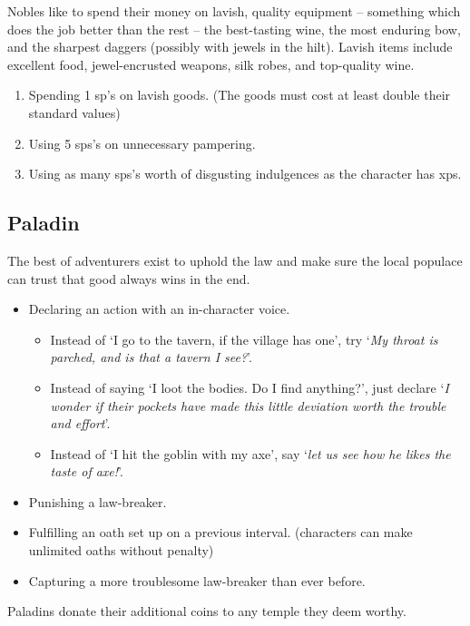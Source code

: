 \begin{multicols}{2}
Nobles like to spend their money on lavish, quality equipment -- something which does the job better than the rest -- the best-tasting wine, the most enduring bow, and the sharpest daggers (possibly with jewels in the hilt).
Lavish items include excellent food, jewel-encrusted weapons, silk robes, and top-quality wine.

\begin{enumerate}
  \item
  Spending 1 \gls{sp}'s on lavish goods.
  (The goods must cost at least double their standard values)
  \item
  Using 5 \glspl{sp}'s on unnecessary pampering.
  \item
  Using as many \glspl{sp}'s worth of disgusting indulgences as the character has \glspl{xp}.
\end{enumerate}

\subsection{Paladin}

The best of adventurers exist to uphold the law and make sure the local populace can trust that good always wins in the end.

\begin{itemize}
  \item
  Declaring an action with an in-character voice.
  \begin{itemize}
    \item
    Instead of `I go to the tavern, if the village has one', try `\textit{My throat is parched, and is that a tavern I see?}'.
    \item
    Instead of saying `I loot the bodies. Do I find anything?', just declare `\textit{I wonder if their pockets have made this little deviation worth the trouble and effort}'.
    \item
    Instead of `I hit the goblin with my axe', say `\textit{let us see how he likes the taste of axe!}'.
  \end{itemize}
  \item
  Punishing a law-breaker.
  \item
  Fulfilling an oath set up on a previous \gls{interval}.
  (characters can make unlimited oaths without penalty)
  \item
  Capturing a more troublesome law-breaker than ever before.
\end{itemize}

Paladins donate their additional coins to any temple they deem worthy.


\end{multicols}
